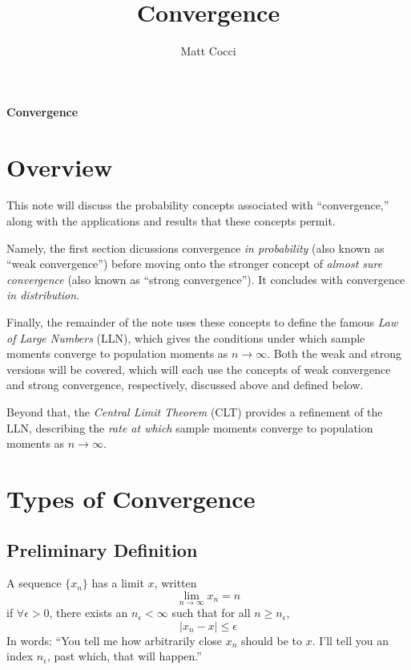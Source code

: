 \documentclass[a4paper,12pt]{scrartcl}
\author{Matt Cocci}
\title{Convergence}
\date{}
\begin{document}
\begin{center}
   \LARGE
   \textbf{Convergence}
\end{center}

\section{Overview}

This note will discuss the probability concepts associated
with ``convergence,'' along with the applications and 
results that these concepts permit.

Namely, the first section dicussions convergence 
\emph{in probability} (also known as ``{weak convergence}'')
before moving onto the stronger
concept of \emph{almost sure convergence} (also known 
as ``{strong convergence}'').  It concludes
with convergence \emph{in distribution}.

Finally, the remainder of the note uses these concepts to
define the famous \emph{Law of Large Numbers} (LLN), which
gives the conditions under which sample moments converge
to population moments as $n\rightarrow \infty$.
Both the weak and strong versions will be covered, which will
each use the concepts of weak convergence and strong 
convergence, respectively, discussed above and defined below.

Beyond that, the \emph{Central Limit Theorem} (CLT) provides a
refinement of the LLN, describing the \emph{rate at which}
sample moments converge to population moments as 
$n\rightarrow\infty$. 



\section{Types of Convergence}

\subsection{Preliminary Definition}

A sequence $\{x_n\}$ has a limit $x$, written 
\begin{equation}
    \lim_{n\rightarrow\infty} x_n = n
\end{equation}
if $\forall \epsilon > 0$, there exists an $n_\epsilon < \infty$
such that for all $n \geq n_\epsilon$,  
    \[  |x_n - x| \leq \epsilon \]
In words: ``You tell me how arbitrarily close $x_n$ should
be to $x$. I'll tell you an index $n_\epsilon$, past which,
that will happen.''
\end{document}
